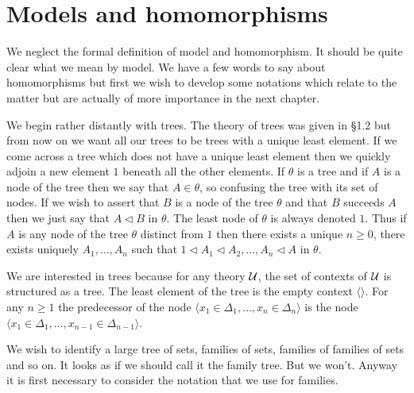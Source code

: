 \section{Models and homomorphisms} \label{sec:source-1-9}

We neglect the formal definition of model and homomorphism.
%
It should be quite clear what we mean by model.
%
We have a few words to say about homomorphisms but first we wish to develop some notations which relate to the matter but are actually of more importance in the next chapter.

We begin rather distantly with trees.
%
The theory of trees was given in \S 1.2 but from now on we want all our trees to be trees with a unique least element.
%
If we come across a tree which does not have a unique least element then we quickly adjoin a new element $1$  beneath all the other elements.
%
If $\theta$ is a tree and if $A$ is a node of the tree then we say that $A\in\theta$, so confusing the tree with its set of nodes.
%
If we wish to assert that $B$ is a node of the tree $\theta$ and that $B$ succeeds $A$ then we just say that $A\triangleleft B$ in $\theta$.
%
The least node of $\theta$ is always denoted $1$.
%
Thus if $A$ is any node of the tree $\theta$ distinct from $1$ then there exists a unique $n\geq 0$, there exists uniquely $A_1,\ldots,A_n$ such that $1\triangleleft A_1\triangleleft A_2,\ldots,A_n\triangleleft A$ in $\theta$.

We are interested in trees because for any theory $\mathcal{U}$, the set of contexts of $\mathcal{U}$ is structured as a tree.
%
The least element of the tree is the empty context $\langle\rangle$.
%
For any $n\geq 1$ the predecessor of the node $\langle x_1\in\Delta_1,\ldots,x_n\in\Delta_n\rangle$ is the node $\langle x_1\in\Delta_1,\ldots,x_{n-1}\in\Delta_{n-1}\rangle$.

We wish to identify a large tree of sets, families of sets, families of families of sets and so on.
%
It looks as if we should call it the family tree.
%
But we won't.
%
Anyway it is first necessary to consider the notation that we use for families.

